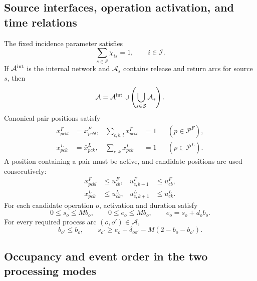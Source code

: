 \documentclass[journal]{IEEEtran}
\begin{document}
\subsection{Source interfaces, operation activation, and time relations}

The fixed incidence parameter satisfies
\begin{equation}
\sum_{s\in\mathcal S}\chi_{is}=1,
\qquad i\in\mathcal I.
\label{eq:source-membership-en}
\end{equation}
If $\mathcal A^{\rm int}$ is the internal network and $\mathcal A_s$ contains release and return arcs for source $s$, then
\begin{equation}
\mathcal A=\mathcal A^{\rm int}\cup
\left(\bigcup_{s\in\mathcal S}\mathcal A_s\right).
\label{eq:route-union-en}
\end{equation}
Canonical pair positions satisfy
\begin{equation}
\begin{aligned}
x^F_{pcbl}&=\bar x^F_{pcbl}, &
\sum_{c,b,l}x^F_{pcbl}&=1 &&(p\in\mathcal P^F),\\
x^L_{pck}&=\bar x^L_{pck}, &
\sum_{c,k}x^L_{pck}&=1 &&(p\in\mathcal P^L).
\end{aligned}
\label{eq:pair-slot-en}
\end{equation}
A position containing a pair must be active, and candidate positions are used consecutively:
\begin{equation}
\begin{aligned}
x^F_{pcbl}&\le u^F_{cb}, &u^F_{c,b+1}&\le u^F_{cb},\\
x^L_{pck}&\le u^L_{ck}, &u^L_{c,k+1}&\le u^L_{ck}.
\end{aligned}
\label{eq:activation-prefix-en}
\end{equation}
For each candidate operation $o$, activation and duration satisfy
\begin{equation}
0\le s_o\le Mb_o,\qquad
0\le e_o\le Mb_o,\qquad
e_o=s_o+d_ob_o.
\label{eq:operation-time-en}
\end{equation}
For every required process arc $(o,o')\in\mathcal A$,
\begin{equation}
b_{o'}\le b_o,\qquad
s_{o'}\ge e_o+\delta_{oo'}-M(2-b_o-b_{o'}).
\label{eq:precedence-en}
\end{equation}
\subsection{Occupancy and event order in the two processing modes}
\end{document}
